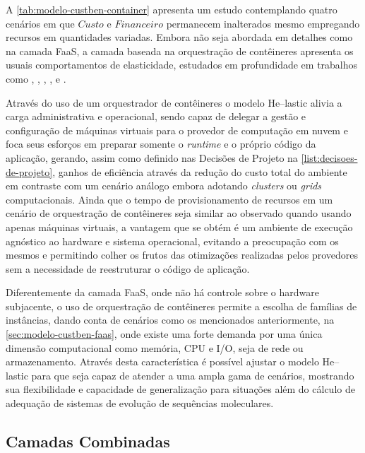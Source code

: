 \documentclass[english,brazilian]{UNISINOSmonografia} %
\begin{document}
A \autoref{tab:modelo-custben-container} apresenta um estudo contemplando quatro cenários em que $ Custo $ e $ Financeiro $ permanecem inalterados mesmo empregando recursos em quantidades variadas.
Embora não seja abordada em detalhes como na camada FaaS, a camada baseada na orquestração de contêineres apresenta os usuais comportamentos de elasticidade, estudados em profundidade em trabalhos como , , , ,  e .


Através do uso de um orquestrador de contêineres o modelo \textsf{He}--lastic alivia a carga administrativa e operacional, sendo capaz de delegar a gestão e configuração de máquinas virtuais para o provedor de computação em nuvem e foca seus esforços em preparar somente o \textit{runtime} e o próprio código da aplicação, gerando, assim como definido nas Decisões de Projeto na \autoref{list:decisoes-de-projeto}, ganhos de eficiência através da redução do custo total do ambiente em contraste com um cenário análogo embora adotando \textit{clusters} ou \textit{grids} computacionais.
Ainda que o tempo de provisionamento de recursos em um cenário de orquestração de contêineres seja similar ao observado quando usando apenas máquinas virtuais, a vantagem que se obtém é um ambiente de execução agnóstico ao hardware e sistema operacional, evitando a preocupação com os mesmos e permitindo colher os frutos das otimizações realizadas pelos provedores sem a necessidade de reestruturar o código de aplicação.


Diferentemente da camada FaaS, onde não há controle sobre o hardware subjacente, o uso de orquestração de contêineres permite a escolha de famílias de instâncias, dando conta de cenários como os mencionados anteriormente, na \autoref{sec:modelo-custben-faas}, onde existe uma forte demanda por uma única dimensão computacional como memória, CPU e I/O, seja de rede ou armazenamento.
Através desta característica é possível ajustar o modelo \textsf{He}--lastic para que seja capaz de atender a uma ampla gama de cenários, mostrando sua flexibilidade e capacidade de generalização para situações além do cálculo de adequação de sistemas de evolução de sequências moleculares.


\subsection{Camadas Combinadas}
\end{document}
